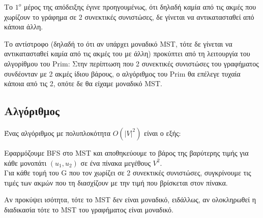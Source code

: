 \documentclass[a4paper,11pt]{article}
\begin{document}
Το $1^o$ μέρος της απόδειξης έγινε προηγουμένως, ότι δηλαδή καμία από τις ακμές
που χωρίζουν το γράφημα σε 2 συνεκτικές συνιστώσες, δε γίνεται να
αντικατασταθεί από κάποια άλλη.

Το αντίστροφο (δηλαδή το ότι αν υπάρχει μοναδικό MST, τότε δε γίνεται να
αντικατασταθεί καμία από τις ακμές του με άλλη) προκύπτει από τη λειτουργία
του αλγορίθμου του Prim: Στην περίπτωση που 2 συνεκτικές συνιστώσες του
γραφήματος συνδέονταν με 2 ακμές ίδιου βάρους, ο αλγόριθμος του Prim θα επέλεγε
τυχαία κάποια από τις 2, οπότε δε θα είχαμε μοναδικό MST.

\subsection{Αλγόριθμος}
Ένας αλγόριθμος με πολυπλοκότητα $O(|V|^2)$ είναι ο εξής:

Εφαρμόζουμε BFS στο MST και αποθηκεύουμε το βάρος της βαρύτερης
τιμής για κάθε μονοπάτι $(u_1,u_2)$ σε ένα πίνακα μεγέθους $V^2$. \\
Για κάθε τομή του G που τον χωρίζει σε 2 συνεκτικές συνιστώσες, συγκρίνουμε
τις τιμές των ακμών που τη διασχίζουν με την τιμή που βρίσκεται στον πίνακα.

Αν προκύψει ισότητα, τότε το MST δεν είναι μοναδικό, ειδάλλως, αν ολοκληρωθεί
η διαδικασία τότε το MST του γραφήματος είναι μοναδικό.

\end{document}
